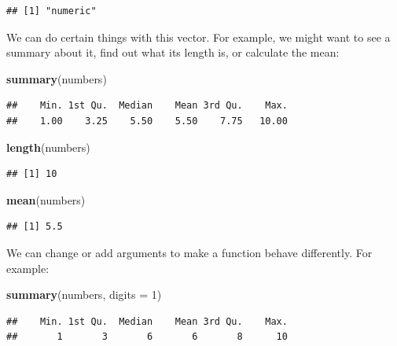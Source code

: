 \documentclass[
]{book}
\newenvironment{Shaded}{\begin{snugshade}}{\end{snugshade}}
\newcommand{\DataTypeTok}[1]{\textcolor[rgb]{0.13,0.29,0.53}{#1}}
\newcommand{\DecValTok}[1]{\textcolor[rgb]{0.00,0.00,0.81}{#1}}
\newcommand{\KeywordTok}[1]{\textcolor[rgb]{0.13,0.29,0.53}{\textbf{#1}}}
\newcommand{\NormalTok}[1]{#1}
\begin{document}
\begin{verbatim}
## [1] "numeric"
\end{verbatim}

We can do certain things with this vector. For example, we might want to see a
summary about it, find out what its length is, or calculate the mean:

\begin{Shaded}
\begin{Highlighting}[]
\KeywordTok{summary}\NormalTok{(numbers)}
\end{Highlighting}
\end{Shaded}

\begin{verbatim}
##    Min. 1st Qu.  Median    Mean 3rd Qu.    Max. 
##    1.00    3.25    5.50    5.50    7.75   10.00
\end{verbatim}

\begin{Shaded}
\begin{Highlighting}[]
\KeywordTok{length}\NormalTok{(numbers)}
\end{Highlighting}
\end{Shaded}

\begin{verbatim}
## [1] 10
\end{verbatim}

\begin{Shaded}
\begin{Highlighting}[]
\KeywordTok{mean}\NormalTok{(numbers)}
\end{Highlighting}
\end{Shaded}

\begin{verbatim}
## [1] 5.5
\end{verbatim}

We can change or add arguments to make a function behave differently. For example:

\begin{Shaded}
\begin{Highlighting}[]
\KeywordTok{summary}\NormalTok{(numbers, }\DataTypeTok{digits =} \DecValTok{1}\NormalTok{)}
\end{Highlighting}
\end{Shaded}

\begin{verbatim}
##    Min. 1st Qu.  Median    Mean 3rd Qu.    Max. 
##       1       3       6       6       8      10
\end{verbatim}
\end{document}
